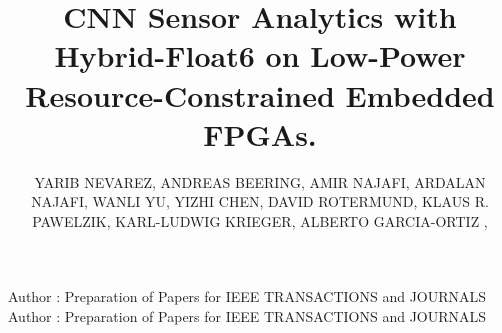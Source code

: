 \title {CNN Sensor Analytics with Hybrid-Float6 on Low-Power Resource-Constrained Embedded FPGAs.}

\author{
	\uppercase{Yarib Nevarez},
	\uppercase{Andreas Beering},
	\uppercase{Amir Najafi},
	\uppercase{Ardalan Najafi},
	\uppercase{Wanli Yu},
	\uppercase{Yizhi Chen},
	\uppercase{David Rotermund},
	\uppercase{Klaus R. Pawelzik},
	\uppercase{Karl-Ludwig Krieger},
	\uppercase{Alberto Garcia-Ortiz} ,
}

\address[1]{Institute of Electrodynamics and Microelectronics, University of Bremen, Bremen 28359, Germany}

\address[2]{Institute for Theoretical Physics, University of Bremen, Bremen 28359, Germany}

\address[3]{School of Electrical Engineering and Computer Science, KTH Royal Institute of Technology, 10044 Stockholm, Sweden}



\markboth
{Author \headeretal: Preparation of Papers for IEEE TRANSACTIONS and JOURNALS}
{Author \headeretal: Preparation of Papers for IEEE TRANSACTIONS and JOURNALS}



